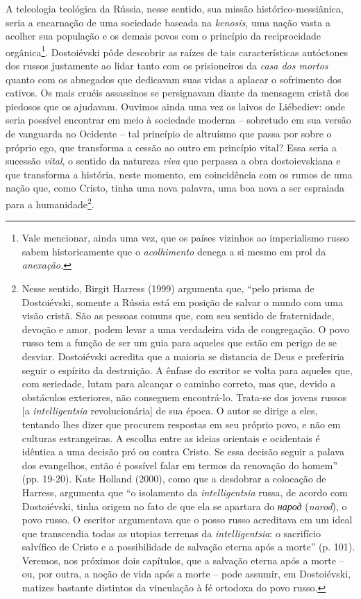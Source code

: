 A teleologia teológica da Rússia, nesse sentido, sua missão
histórico-messiânica, seria a encarnação de uma sociedade baseada na
\emph{kenosis}, uma nação vasta a acolher sua população e os demais
povos com o princípio da reciprocidade orgânica\footnote{Vale mencionar,
  ainda uma vez, que os países vizinhos ao imperialismo russo sabem
  historicamente que o \emph{acolhimento} denega a si mesmo em prol da
  \emph{anexação. }}. Dostoiévski pôde descobrir as raízes de tais
características autóctones dos russos justamente ao lidar tanto com os
prisioneiros da \emph{casa dos mortos} quanto com os abnegados que
dedicavam suas vidas a aplacar o sofrimento dos cativos. Os mais cruéis
assassinos se persignavam diante da mensagem cristã dos piedosos que os
ajudavam. Ouvimos ainda uma vez os laivos de Liébediev: onde seria
possível encontrar em meio à sociedade moderna -- sobretudo em sua
versão de vanguarda no Ocidente -- tal princípio de altruísmo que passa
por sobre o próprio ego, que transforma a cessão ao outro em princípio
vital? Essa seria a sucessão \emph{vital}, o sentido da natureza
\emph{viva} que perpassa a obra dostoievskiana e que transforma a
história, neste momento, em coincidência com os rumos de uma nação que,
como Cristo, tinha uma nova palavra, uma boa nova a ser espraiada para a
humanidade\footnote{Nesse sentido, Birgit Harress (1999) argumenta que,
  ``pelo prisma de Dostoiévski, somente a Rússia está em posição de
  salvar o mundo com uma visão cristã. São as pessoas comuns que, com
  seu sentido de fraternidade, devoção e amor, podem levar a uma
  verdadeira vida de congregação. O povo russo tem a função de ser um
  guia para aqueles que estão em perigo de se desviar. Dostoiévski
  acredita que a maioria se distancia de Deus e preferiria seguir o
  espírito da destruição. A ênfase do escritor se volta para aqueles
  que, com seriedade, lutam para alcançar o caminho correto, mas que,
  devido a obstáculos exteriores, não conseguem encontrá-lo. Trata-se
  dos jovens russos [a \emph{intelligentsia} revolucionária] de sua
  época. O autor se dirige a eles, tentando lhes dizer que procurem
  respostas em seu próprio povo, e não em culturas estrangeiras. A
  escolha entre as ideias orientais e ocidentais é idêntica a uma
  decisão pró ou contra Cristo. Se essa decisão seguir a palava dos
  evangelhos, então é possível falar em termos da renovação do homem''
  (pp. 19-20). Kate Holland (2000), como que a desdobrar a colocação de
  Harress, argumenta que ``o isolamento da \emph{intelligentsia} russa,
  de acordo com Dostoiévski, tinha origem no fato de que ela se apartara
  do \emph{народ}
  (\emph{narod}), o povo russo. O escritor argumentava que o posso russo
  acreditava em um ideal que transcendia todas as utopias terrenas da
  \emph{intelligentsia}: o sacrifício salvífico de Cristo e a
  possibilidade de salvação eterna após a morte'' (p. 101). Veremos, nos
  próximos dois capítulos, que a salvação eterna após a morte -- ou, por
  outra, a noção de vida após a morte -- pode assumir, em Dostoiévski,
  matizes bastante distintos da vinculação à fé ortodoxa do povo russo.}.
